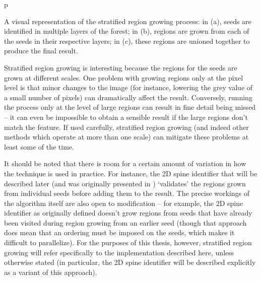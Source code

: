 \begin{stusubfig}{p}
	\\
\caption{A visual representation of the stratified region growing process: in (a), seeds are identified in multiple layers of the forest; in (b), regions are grown from each of the seeds in their respective layers; in (c), these regions are unioned together to produce the final result.}
\label{fig:featureid-techniques-stratifiedregiongrowing}
\end{stusubfig}

Stratified region growing is interesting because the regions for the seeds are grown at different scales. One problem with growing regions only at the pixel level is that minor changes to the image (for instance, lowering the grey value of a small number of pixels) can dramatically affect the result. Conversely, running the process only at the level of large regions can result in fine detail being missed -- it can even be impossible to obtain a sensible result if the large regions don't match the feature. If used carefully, stratified region growing (and indeed other methods which operate at more than one scale) can mitigate these problems at least some of the time.

It should be noted that there is room for a certain amount of variation in how the technique is used in practice. For instance, the 2D spine identifier that will be described later (and was originally presented in \cite{gvcispa09}) `validates' the regions grown from individual seeds before adding them to the result. The precise workings of the algorithm itself are also open to modification -- for example, the 2D spine identifier as originally defined doesn't grow regions from seeds that have already been visited during region growing from an earlier seed (though that approach does mean that an ordering must be imposed on the seeds, which makes it difficult to parallelize). For the purposes of this thesis, however, stratified region growing will refer specifically to the implementation described here, unless otherwise stated (in particular, the 2D spine identifier will be described explicitly as a variant of this approach).

